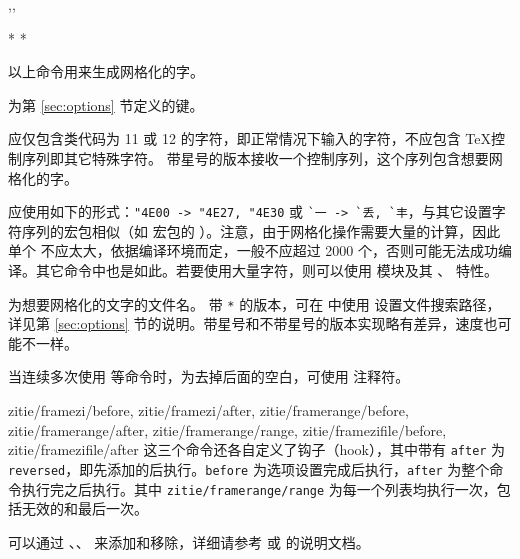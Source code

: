 \documentclass{ctxdoc}
\begin{document}
\begin{function}{\framezi,\framerange,\framezifile}
  \begin{syntax}
     *  
      
     *  
  \end{syntax}
  以上命令用来生成网格化的字。
  
   为第 \ref{sec:options} 节定义的键。

   应仅包含类代码为 11 或 12 的字符，即正常情况下输入的字符，不应包含 \TeX 控制序列即其它特殊字符。 带星号的版本接收一个控制序列，这个序列包含想要网格化的字。

   应使用如下的形式：\verb|"4E00 -> "4E27, "4E30| 或 \verb|`一 -> `丢, `丰|，与其它设置字符序列的宏包相似（如  宏包的 ）。注意，由于网格化操作需要大量的计算，因此单个  不应太大，依据编译环境而定，一般不应超过 2000 个，否则可能无法成功编译。其它命令中也是如此。若要使用大量字符，则可以使用  模块及其 、 特性。

   为想要网格化的文字的文件名。 带 \verb|*| 的版本，可在  中使用  设置文件搜索路径，详见第 \ref{sec:options} 节的说明。带星号和不带星号的版本实现略有差异，速度也可能不一样。

  当连续多次使用  等命令时，为去掉后面的空白，可使用 \opt{\%} 注释符。
\end{function}

\begin{function}{
  zitie/framezi/before, zitie/framezi/after,
  zitie/framerange/before, zitie/framerange/after,
  zitie/framerange/range,
  zitie/framezifile/before, zitie/framezifile/after
}
  这三个命令还各自定义了钩子（hook），其中带有 \verb|after| 为 \verb|reversed|，即先添加的后执行。\verb|before| 为选项设置完成后执行，\verb|after| 为整个命令执行完之后执行。其中 \verb|zitie/framerange/range| 为每一个列表均执行一次，包括无效的和最后一次。

  可以通过 、、 来添加和移除，详细请参考 \cite{pdf-source2e} 或 \cite{pkg-lthooks} 的说明文档。
\end{function}
\end{document}
